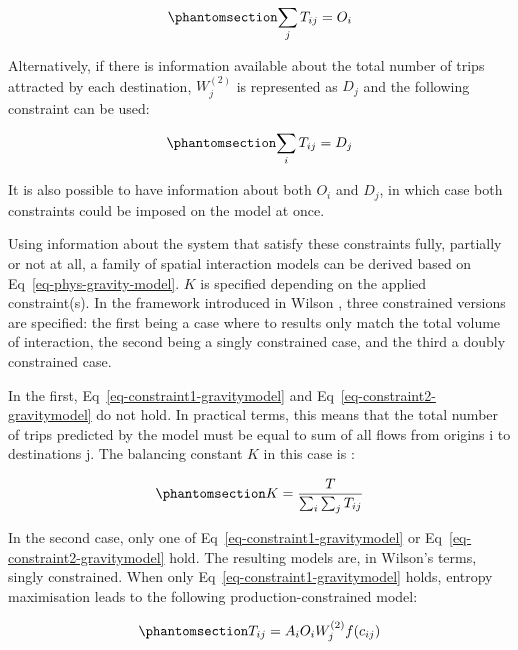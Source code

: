 \documentclass[
  10pt,
  letterpaper,
]{article}
\begin{document}
\begin{equation}\phantomsection\label{eq-constraint1-gravitymodel}{
\sum_j T_{ij} = O_i
}\end{equation}

Alternatively, if there is information available about the total number
of trips attracted by each destination, \(W_j^{(2)}\) is represented as
\(D_j\) and the following constraint can be used:

\begin{equation}\phantomsection\label{eq-constraint2-gravitymodel}{
\sum_i T_{ij} = D_j
}\end{equation}

It is also possible to have information about both \(O_i\) and \(D_j\),
in which case both constraints could be imposed on the model at once.

Using information about the system that satisfy these constraints fully,
partially or not at all, a family of spatial interaction models can be
derived based on Eq~\ref{eq-phys-gravity-model}. \(K\) is specified
depending on the applied constraint(s). In the framework introduced in
Wilson \citep{wilson1971}, three constrained versions are specified: the
first being a case where to results only match the total volume of
interaction, the second being a singly constrained case, and the third a
doubly constrained case.

In the first, Eq~\ref{eq-constraint1-gravitymodel} and
Eq~\ref{eq-constraint2-gravitymodel} do not hold. In practical terms,
this means that the total number of trips predicted by the model must be
equal to sum of all flows from origins i to destinations j. The
balancing constant \(K\) in this case is
\citep[see][]{cliff_evaluating_1974, fotheringham_spatial_1984}:

\begin{equation}\phantomsection\label{eq-total-flow-balancing-factor}{
K=\frac{T}{\sum_i\sum_j T_{ij}}
}\end{equation}

In the second case, only one of Eq~\ref{eq-constraint1-gravitymodel} or
Eq~\ref{eq-constraint2-gravitymodel} hold. The resulting models are, in
Wilson's terms, singly constrained. When only
Eq~\ref{eq-constraint1-gravitymodel} holds, entropy maximisation leads
to the following production-constrained model:

\begin{equation}\phantomsection\label{eq-production-constrained-gravitymodel}{
T_{ij} = A_i O_i W_j^{(2)} f(c_{ij})
}\end{equation}
\end{document}
